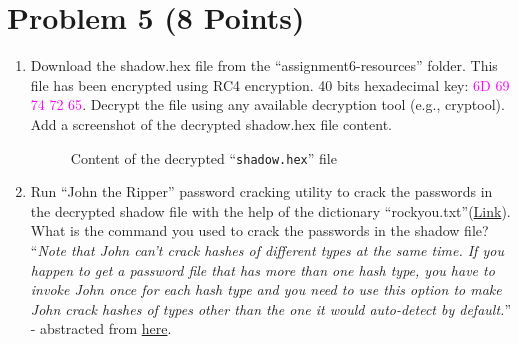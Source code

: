 \documentclass[11pt,letterpaper]{article}
\begin{document}
	
	
	
	\pagebreak
	\section*{Problem 5 (8 Points)}
	
	\begin{enumerate}
		\item Download the shadow.hex file from the ``assignment6-resources'' folder. This file has been encrypted using RC4 encryption. 40 bits hexadecimal key: \textcolor{magenta}{6D 69 74 72 65}. Decrypt the file using any available decryption tool (e.g., cryptool). Add a screenshot of the decrypted shadow.hex file content.
		
		\begin{figure}[h]
			\centering
		\caption{Content of the decrypted ``{\tt shadow.hex}'' file}
		\end{figure}
		
		
		
		\item Run ``John the Ripper'' password cracking utility to crack the passwords in the decrypted shadow file with the help of the dictionary ``rockyou.txt''(\href{https://uniofmora-my.sharepoint.com/:t:/g/personal/scharles_uom_lk/EQvMHge3CrZNpeE7WGXpapoBslFMMcgHih0teepNIwDVIg?e=9aEjJd}{Link}). What is the command you used to crack the passwords in the shadow file?\\		
		
		``\textit{Note that John can't crack hashes of different
			types at the same time.  If you happen to get a password file that has more than one hash type, you have to invoke John once for each hash type and you need to use this option to make John crack hashes of types other than the one it would auto-detect by default.}'' - abstracted from \href{https://github.com/openwall/john/blob/bleeding-jumbo/doc/OPTIONS}{here}.\\


\end{enumerate}
\end{document}
